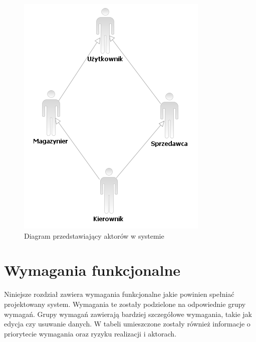 \begin{figure}[h]
    \begin{center}
    \includegraphics[scale=0.75]{../img/diagramDziedziczenia.png}
    \end{center}
    \label{fig:diagramDziedziczenia}
    \caption{Diagram przedstawiający aktorów w systemie}
\end{figure}
\FloatBarrier

\section{Wymagania funkcjonalne}

Niniejsze rozdział zawiera wymagania funkcjonalne jakie powinien spełniać
projektowany system. Wymagania te zostały podzielone na odpowiednie grupy wymagań.
Grupy wymagań zawierają bardziej szczegółowe wymagania, takie jak edycja czy
usuwanie danych. W tabeli umieszczone zostały również informacje o priorytecie
wymagania oraz ryzyku realizacji i aktorach.


